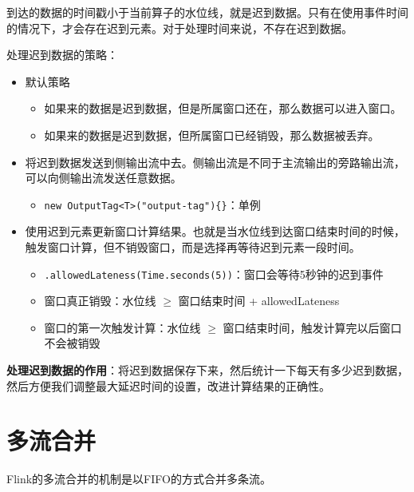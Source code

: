 到达的数据的时间戳小于当前算子的水位线，就是迟到数据。{只有在使用事件时间的情况下，才会存在迟到元素}。对于处理时间来说，不存在迟到数据。

处理迟到数据的策略：

\begin{itemize}
\tightlist
\item
  默认策略

  \begin{itemize}
  \tightlist
  \item
    如果来的数据是迟到数据，但是所属窗口还在，那么数据可以进入窗口。
  \item
    如果来的数据是迟到数据，但所属窗口已经销毁，那么数据被丢弃。
  \end{itemize}
\item
  将迟到数据发送到{侧输出流}中去。侧输出流是不同于主流输出的旁路输出流，可以向侧输出流发送任意数据。

  \begin{itemize}
  \tightlist
  \item
    \texttt{new\ OutputTag\textless{}T\textgreater{}("output-tag")\{\}}：单例
  \end{itemize}
\item
  使用迟到元素{更新}窗口计算结果。也就是当水位线到达窗口结束时间的时候，触发窗口计算，但不销毁窗口，而是选择再等待迟到元素一段时间。

  \begin{itemize}
  \tightlist
  \item
    \texttt{.allowedLateness(Time.seconds(5))}：窗口会等待5秒钟的迟到事件
  \item
    窗口真正销毁：水位线 \(\ge\) 窗口结束时间 + allowedLateness
  \item
    窗口的第一次触发计算：水位线 \(\ge\)
    窗口结束时间，触发计算完以后窗口不会被销毁
  \end{itemize}
\end{itemize}

\textbf{处理迟到数据的作用}：将迟到数据保存下来，然后统计一下每天有多少迟到数据，然后方便我们调整最大延迟时间的设置，改进计算结果的正确性。

\hypertarget{ux591aux6d41ux5408ux5e76}{%
\section{多流合并}\label{ux591aux6d41ux5408ux5e76}}

Flink的多流合并的机制是以{FIFO}的方式合并多条流。

